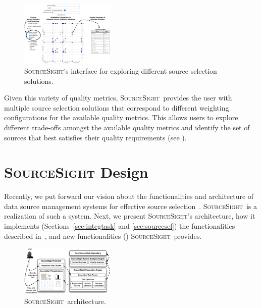 \documentclass{sig-alternate-05-2015}
\newcommand\system{\textsc{SourceSight}}
\begin{document}
\begin{figure}
	\begin{center}
	\includegraphics[trim=0 0 0 85, clip,width=0.40\textwidth]{fig/ssResults}
	\vspace{-10pt}
	\caption{\system's interface for exploring different source selection solutions.}
	\label{fig:ssresults}
	\end{center}
	\vspace{-22pt}
\end{figure}

Given this variety of quality metrics, \system~provides the user with multiple source selection solutions that correspond to different weighting configurations for the available quality metrics. This allows users to explore different trade-offs amongst the available quality metrics and identify the set of sources that best satisfies their quality requirements (see ).

\section{{\Large \system} Design}
\label{sec:design}
Recently, we put forward our vision about the functionalities and architecture of data source management systems for effective source selection~\cite{rekatsinas:2015}. 
\system~is a realization of such a system. Next, we present \system's architecture, how it implements (Sections~\ref{sec:integtask} and \ref{sec:sourcesel}) the functionalities described in~\cite{rekatsinas:2015}, and new functionalities () \system~provides.

\begin{figure}[h]
    \centering
    	\vspace{-5pt}
    \includegraphics[width=0.4\textwidth]{fig/srcsightOver}
    	\vspace{-10pt}
    \caption{\system~architecture.}
    \label{fig:architecture}
    	\vspace{-15pt}
\end{figure}
\end{document}
